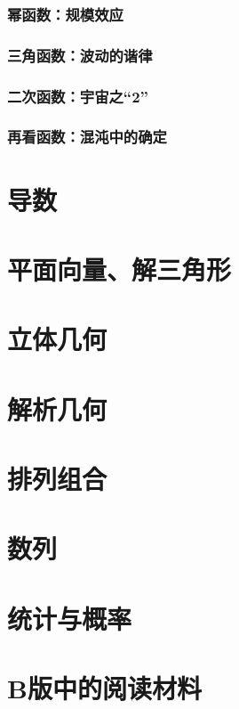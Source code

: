 \documentclass[a4paper,openany]{ctexbook}
\begin{document}
\subsection{幂函数：规模效应}

\subsection{三角函数：波动的谐律}

\subsection{二次函数：宇宙之“2”}

\subsection{再看函数：混沌中的确定}

\chapter{导数}

\chapter{平面向量、解三角形}

\chapter{立体几何}

\chapter{解析几何}

\chapter{排列组合}

\chapter{数列}

\chapter{统计与概率}

\appendix

\chapter{B版中的阅读材料}
\end{document}
